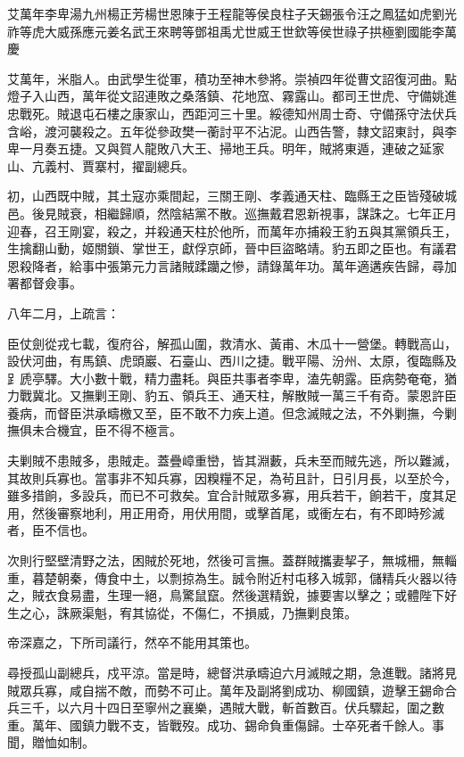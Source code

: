 
\begin{pinyinscope}
艾萬年李卑湯九州楊正芳楊世恩陳于王程龍等侯良柱子天錫張令汪之鳳猛如虎劉光祚等虎大威孫應元姜名武王來聘等鄧祖禹尤世威王世欽等侯世祿子拱極劉國能李萬慶

艾萬年，米脂人。由武學生從軍，積功至神木參將。崇禎四年從曹文詔復河曲。點燈子入山西，萬年從文詔連敗之桑落鎮、花地窊、霧露山。都司王世虎、守備姚進忠戰死。賊退屯石樓之康家山，西距河三十里。綏德知州周士奇、守備孫守法伏兵含峪，渡河襲殺之。五年從參政樊一蘅討平不沾泥。山西告警，隸文詔東討，與李卑一月奏五捷。又與賀人龍敗八大王、掃地王兵。明年，賊將東遁，連破之延家山、亢義村、賈寨村，擢副總兵。

初，山西既中賊，其土寇亦乘間起，三關王剛、孝義通天柱、臨縣王之臣皆殘破城邑。後見賊衰，相繼歸順，然陰結黨不散。巡撫戴君恩新視事，謀誅之。七年正月迎春，召王剛宴，殺之，并殺通天柱於他所，而萬年亦捕殺王豹五與其黨領兵王，生擒翻山動，姬關鎖、掌世王，獻俘京師，晉中巨盜略靖。豹五即之臣也。有議君恩殺降者，給事中張第元力言諸賊蹂躪之慘，請錄萬年功。萬年適遘疾告歸，尋加署都督僉事。

八年二月，上疏言：

臣仗劍從戎七載，復府谷，解孤山圍，救清水、黃甫、木瓜十一營堡。轉戰高山，設伏河曲，有馬鎮、虎頭巖、石臺山、西川之捷。戰平陽、汾州、太原，復臨縣及𧾷虒亭驛。大小數十戰，精力盡耗。與臣共事者李卑，溘先朝露。臣病勢奄奄，猶力戰冀北。又撫剿王剛、豹五、領兵王、通天柱，解散賊一萬三千有奇。蒙恩許臣養病，而督臣洪承疇檄又至，臣不敢不力疾上道。但念滅賊之法，不外剿撫，今剿撫俱未合機宜，臣不得不極言。

夫剿賊不患賊多，患賊走。蓋疊嶂重巒，皆其淵藪，兵未至而賊先逃，所以難滅，其故則兵寡也。當事非不知兵寡，因糗糧不足，為茍且計，日引月長，以至於今，雖多措餉，多設兵，而已不可救矣。宜合計賊眾多寡，用兵若干，餉若干，度其足用，然後審察地利，用正用奇，用伏用間，或擊首尾，或衝左右，有不即時殄滅者，臣不信也。

次則行堅壁清野之法，困賊於死地，然後可言撫。蓋群賊攜妻挈子，無城柵，無輜重，暮楚朝秦，傳食中土，以剽掠為生。誠令附近村屯移入城郭，儲精兵火器以待之，賊衣食易盡，生理一絕，鳥驚鼠竄。然後選精銳，據要害以擊之；或體陛下好生之心，誅厥渠魁，宥其協從，不傷仁，不損威，乃撫剿良策。

帝深嘉之，下所司議行，然卒不能用其策也。

尋授孤山副總兵，戍平涼。當是時，總督洪承疇迫六月滅賊之期，急進戰。諸將見賊眾兵寡，咸自揣不敵，而勢不可止。萬年及副將劉成功、柳國鎮，遊擊王錫命合兵三千，以六月十四日至寧州之襄樂，遇賊大戰，斬首數百。伏兵驟起，圍之數重。萬年、國鎮力戰不支，皆戰歿。成功、錫命負重傷歸。士卒死者千餘人。事聞，贈恤如制。


\end{pinyinscope}
